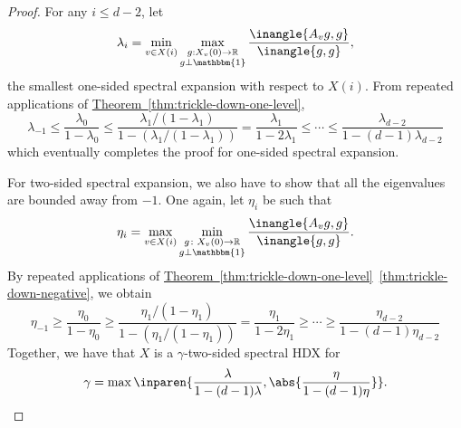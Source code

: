 \documentclass[11pt]{article}
\newcommand{\expref}[2]{\texorpdfstring{\hyperref[#2]{#1~\ref{#2}}}{#1~\ref{#2}}}
\newcommand{\R}{{\mathbb R}}
\begin{document}
\begin{proof}
  For any $i \leq d-2$, let
  \[\lambda_i = \min_{v\in X(i)} \max_{\substack{g:X_v(0) \rightarrow \R\\g\perp \mathbbm{1}}}\frac{\inangle{A_v g,g}}{\inangle{g,g}},
  \]
  the smallest one-sided spectral expansion with respect to $X(i)$. From repeated applications of  \expref{Theorem}{thm:trickle-down-one-level},
  \[
    \lambda_{-1} \leq \frac{\lambda_0}{1 - \lambda_0} \leq \frac{\lambda_{1}/(1-\lambda_{1})}{1 - (\lambda_{1}/(1-\lambda_{1}))} = \frac{\lambda_{1}}{1 - 2\lambda_{1}} \leq \cdots \leq \frac{\lambda_{d-2}}{1 - (d-1)\lambda_{d-2}}
  \]
  which eventually completes the proof for one-sided spectral expansion.

  For two-sided spectral expansion, we also have to show that all the eigenvalues are bounded away from $-1$. One again, let $\eta_i$ be such that
  \[
    \eta_i = \max_{v\in X(i)} \min_{\substack{g\colon X_v(0) \rightarrow \R\\g\perp \mathbbm{1}}}\frac{\inangle{A_v g,g}}{\inangle{g,g}}.    
  \]
  By repeated applications of \expref{Theorem}{thm:trickle-down-one-level}~\eqref{thm:trickle-down-negative}, we obtain
  \[
    \eta_{-1} \geq \frac{\eta_0}{1 - \eta_0} \geq \frac{\eta_{1}/(1-\eta_{1})}{1 - (\eta_{1}/(1-\eta_{1}))} = \frac{\eta_{1}}{1 - 2\eta_{1}} \geq \cdots \geq \frac{\eta_{d-2}}{1 - (d-1)\eta_{d-2}}
  \]
  Together, we have that $X$ is a $\gamma$-two-sided spectral HDX for
  \[
  \gamma = \max\inparen{\frac{\lambda}{1 - (d-1)\lambda}, \abs{\frac{\eta}{1 - (d-1)\eta}}}.\qedhere
  \]
  \end{proof}
\end{document}
